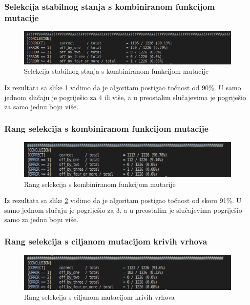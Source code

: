 \documentclass[times, utf8, zavrsni]{fer}
\begin{document}
\subsubsection{Selekcija stabilnog stanja s kombiniranom funkcijom mutacije}

\begin{figure}[h]
\centering
\includegraphics[width=14cm]{images/custom_mutacija_200_249.png}
\caption{Selekcija stabilnog stanja s kombiniranom funkcijom mutacije}
\label{fig:sss kombinirana rezultati}
\end{figure}

Iz rezultata sa slike \ref{fig:sss kombinirana rezultati} vidimo da je algoritam postigao točnost od 90\%. U samo jednom slučaju je pogriješio za 4 ili više, a u preostalim slučajevima je pogriješio za samo jednu boju više.

\subsubsection{Rang selekcija s kombiniranom funkcijom mutacije}

\begin{figure}[h]
\centering
\includegraphics[width=14cm]{images/mutation_func_rank_selection_200_249.png}
\caption{Rang selekcija s kombiniranom funkcijom mutacije}
\label{fig:rank selekcija kombinirana rezultati}
\end{figure}

Iz rezultata sa slike \ref{fig:rank selekcija kombinirana rezultati} vidimo da je algoritam postigao točnost od skoro 91\%. U samo jednom slučaju je pogriješio za 3, a u preostalim je slučajevima pogriješio samo za jednu boju više.

\newpage
\subsubsection{Rang selekcija s ciljanom mutacijom krivih vrhova}

\begin{figure}[h]
\centering
\includegraphics[width=14cm]{images/targeted_change_on_bad_vertices_rank_selection_200_249.png}
\caption{Rang selekcija s ciljanom mutacijom krivih vrhova}
\label{fig:rank selekcija ciljana random rezultati}
\end{figure}
\end{document}
